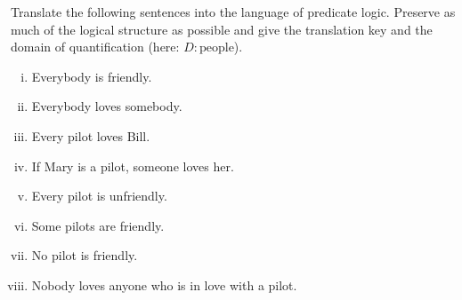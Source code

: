 \documentclass[nobib,nofonts]{tufte-handout}
\begin{document}
{\begin{minipage}{1.0\textwidth}
    \begin{exercise}
      Translate the following sentences into the language of predicate logic. Preserve as much of   the logical structure as possible and give the translation key and the domain of   quantification (here: $D: \text{people}$).
      \begin{enumerate}[(i)]
        \item Everybody is friendly.
        \item Everybody loves somebody.
        \item Every pilot loves Bill.
        \item If Mary is a pilot, someone loves her.
        \item Every pilot is unfriendly.
        \item Some pilots are friendly.
        \item No pilot is friendly.
        \item Nobody loves anyone who is in love with a pilot.
      \end{enumerate}
    \end{exercise}
  \end{minipage}
}
\end{document}
